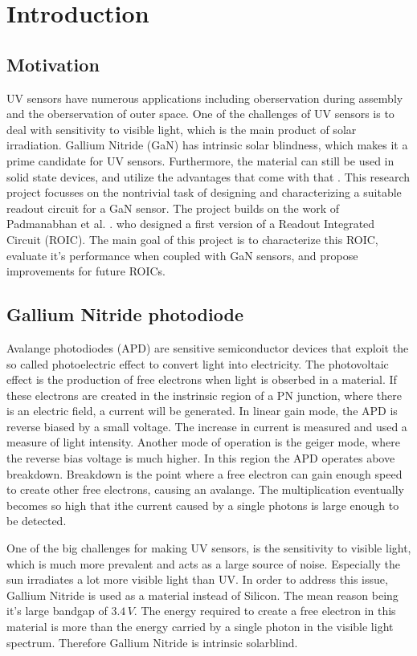 \section{Introduction}\label{sec:introduction}

\subsection{Motivation}\label{ssec:motivation}
UV sensors have numerous applications including oberservation during assembly and the oberservation of outer space. One of the challenges of UV sensors is to deal with sensitivity to visible light, which is the main product of solar irradiation. Gallium Nitride (GaN) has intrinsic solar blindness, which makes it a prime candidate for UV sensors. Furthermore, the material can still be used in solid state devices, and utilize the advantages that come with that . This research project focusses on the nontrivial task of designing and characterizing a suitable readout circuit for a GaN sensor. The project builds on the work of Padmanabhan et al. \cite{preethi}. who designed a first version of a Readout Integrated Circuit (ROIC). The main goal of this project is to characterize this ROIC, evaluate it's performance when coupled with GaN sensors, and propose improvements for future ROICs.

\subsection{Gallium Nitride photodiode}\label{ssec:gallium_nitride_uv_sensors}
Avalange photodiodes (APD) are sensitive semiconductor devices that exploit the so called photoelectric effect to convert light into electricity. The photovoltaic effect is the production of free electrons when light is obserbed in a material. If these electrons are created in the instrinsic region of a PN junction, where there is an electric field, a current will be generated. In linear gain mode, the APD is reverse biased by a small voltage. The increase in current is measured and used a measure of light intensity. Another mode of operation is the geiger mode, where the reverse bias voltage is much higher. In this region the APD operates above breakdown. Breakdown is the point where a free electron can gain enough speed to create other free electrons, causing an avalange. The multiplication eventually becomes so high that ithe current caused by a single photons is large enough to be detected. 

One of the big challenges for making UV sensors, is the sensitivity to visible light, which is much more prevalent and acts as a large source of noise. Especially the sun irradiates a lot more visible light than UV. In order to address this issue, Gallium Nitride is used as a material instead of Silicon. The mean reason being it's large bandgap of $3.4\,V$. The energy required to create a free electron in this material is more than the energy carried by a single photon in the visible light spectrum. Therefore Gallium Nitride is intrinsic solarblind. 

